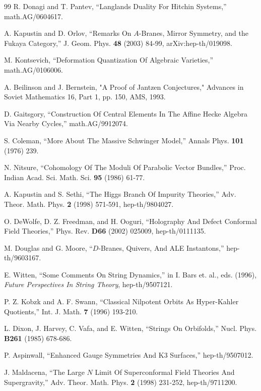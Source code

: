 \begin{thebibliography}{99}
 R. Donagi and T. Pantev, ``Langlands Duality For
Hitchin Systems,'' math.AG/0604617.

 A.
Kapustin and D. Orlov, ``Remarks On $A$-Branes, Mirror Symmetry,
and the Fukaya Category,'' J. Geom. Phys. {\bf 48} (2003) 84-99,
arXiv:hep-th/019098.

 M. Kontsevich, ``Deformation Quantization Of
Algebraic Varieties,'' math.AG/0106006.

 A. Beilinson and J. Bernstein, "A Proof of Jantzen Conjectures,"
  Advances in Soviet Mathematics 16, Part 1, pp. 150, AMS, 1993.

 D. Gaitsgory, ``Construction Of Central Elements In
The Affine Hecke Algebra Via Nearby Cycles,'' math.AG/9912074.

 S. Coleman, ``More
About The Massive Schwinger Model,'' Annals Phys. {\bf 101} (1976)
239.

 N. Nitsure,
``Cohomology Of The Moduli Of Parabolic Vector Bundles,'' Proc. Indian Acad. Sci. Math. Sci.
{\bf 95} (1986) 61-77.

 A. Kapustin and S. Sethi,  ``The Higgs Branch Of Impurity Theories,''
Adv. Theor. Math. Phys. {\bf 2} (1998) 571-591,
hep-th/9804027.

 O. DeWolfe, D.
Z. Freedman, and H. Ooguri, ``Holography And Defect Conformal Field Theories,'' Phys. Rev. {\bf
D66} (2002) 025009, hep-th/0111135.

 M. Douglas and G. Moore, ``$D$-Branes, Quivers, And ALE Instantons,''
hep-th/9603167.

 E. Witten, ``Some Comments On String Dynamics,'' in I. Bars et. al., eds. (1996),
{\it Future Perspectives In String Theory},
hep-th/9507121.

 P. Z. Kobzk and A. F.
Swann, ``Classical Nilpotent Orbits As Hyper-Kahler Quotients,'' Int. J. Math. {\bf 7} (1996)
193-210.

 L. Dixon, J. Harvey, C. Vafa, and E. Witten,
``Strings On Orbifolds,'' Nucl. Phys. {\bf B261} (1985) 678-686.

 P. Aspinwall, ``Enhanced Gauge Symmetries And
K3 Surfaces,'' hep-th/9507012.

 J. Maldacena, ``The Large $N$ Limit Of
Superconformal Field Theories And Supergravity,'' Adv. Theor. Math. Phys. {\bf 2} (1998) 231-252,
hep-th/9711200.


\end{thebibliography}
